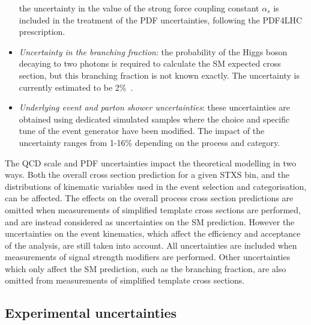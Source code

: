 \begin{itemize}
  the uncertainty in the value of the strong force coupling constant $\alpha_{s}$ 
  is included in the treatment of the PDF uncertainties, following the PDF4LHC prescription.
\item \textit{Uncertainty in the \Hgg branching fraction}: 
  the probability of the Higgs boson decaying to two photons is required to calculate
  the SM expected cross section, but this branching fraction is not known exactly.
  The uncertainty is currently estimated to be 2\%~\cite{YR4}.
\item \textit{Underlying event and parton shower uncertainties}: 
  these uncertainties are obtained using dedicated simulated samples 
  where the choice and specific tune of the event generator have been modified. 
  The impact of the uncertainty ranges from 1-16\% depending on the process and category.
\end{itemize}

The QCD scale and PDF uncertainties impact the theoretical modelling in two ways.
Both the overall cross section prediction for a given STXS bin, 
and the distributions of kinematic variables used in the event selection and categorisation,
can be affected.
The effects on the overall process cross section predictions are omitted 
when measurements of simplified template cross sections are performed,
and are instead considered as uncertainties on the SM prediction.
However the uncertainties on the event kinematics, 
which affect the efficiency and acceptance of the analysis, 
are still taken into account.
All uncertainties are included when measurements of signal strength modifiers are performed.
Other uncertainties which only affect the SM prediction, 
such as the \Hgg branching fraction, 
are also omitted from measurements of simplified template cross sections.

\subsection{Experimental uncertainties}

